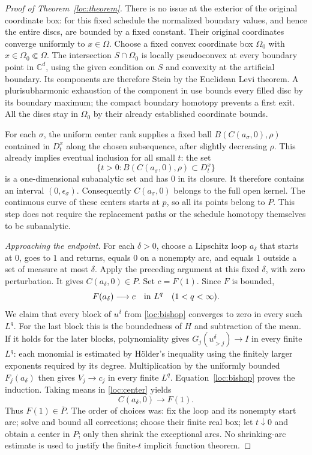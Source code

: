 \begin{proof}[Proof of Theorem~\ref{loc:theorem}]
There is no issue at the exterior of the original coordinate box:
for this fixed schedule the normalized boundary values, and hence
the entire discs, are bounded by a fixed constant.  Their original
coordinates converge uniformly to $x\in\Omega$.  Choose a fixed
convex coordinate box $\Omega_0$ with $x\in\Omega_0\Subset\Omega$.
The intersection $S\cap\Omega_0$ is locally pseudoconvex at every
boundary point in $\mathbb C^d$, using the given condition on $S$ and
convexity at the artificial boundary.  Its components are therefore
Stein by the Euclidean Levi theorem.  A plurisubharmonic exhaustion
of the component in use bounds every filled disc by its boundary
maximum; the compact boundary homotopy prevents a first exit.  All
the discs stay in $\Omega_0$ by their already established coordinate
bounds.

For each $\sigma$, the uniform center rank supplies a fixed ball
$B(C(a_\sigma,0),\rho)$ contained in $D_t^x$ along the chosen
subsequence, after slightly decreasing $\rho$.  This already implies
eventual inclusion for all small $t$: the set
\[
 \{t>0:B(C(a_\sigma,0),\rho)\subset D_t^x\}
\]
is a one-dimensional subanalytic set and has $0$ in its closure.
It therefore contains an interval $(0,\epsilon_\sigma)$.
Consequently $C(a_\sigma,0)$ belongs to the full open kernel.  The
continuous curve of these centers starts at $p$, so all its points
belong to $P$.  This step does not require the replacement paths or
the schedule homotopy themselves to be subanalytic.

\emph{Approaching the endpoint.}
For each $\delta>0$, choose a Lipschitz loop $a_\delta$ that starts at
$0$, goes to $1$ and returns, equals $0$ on a nonempty arc, and equals
$1$ outside a set of measure at most $\delta$.  Apply the preceding
argument at this fixed $\delta$, with zero perturbation.  It gives
$C(a_\delta,0)\in P$.  Set $c=F(1)$.  Since $F$ is bounded,
\[
 F(a_\delta)\longrightarrow c\quad\hbox{in }L^q
                            \quad(1<q<\infty).
\]
We claim that every block of $u^\delta$ from \eqref{loc:bishop}
converges to zero in every such $L^q$.  For the last block this is
the boundedness of $H$ and subtraction of the mean.  If it holds
for the later blocks, polynomiality gives
$G_j(u_{>j}^\delta)\to I$ in every finite $L^q$: each monomial is
estimated by H\"older's inequality using the finitely larger
exponents required by its degree.  Multiplication by the uniformly
bounded $F_j(a_\delta)$ then gives $V_j\to c_j$ in every finite
$L^q$.  Equation~\eqref{loc:bishop} proves the induction.  Taking
means in \eqref{loc:center} yields
\[
                         C(a_\delta,0)\longrightarrow F(1).
\]
Thus $F(1)\in\overline P$.  The order of choices was: fix the loop
and its nonempty start arc; solve and bound all corrections; choose
their finite real box; let $t\downarrow0$ and obtain a center in $P$;
only then shrink the exceptional arcs.  No shrinking-arc estimate is
used to justify the finite-$t$ implicit function theorem.


\end{proof}
